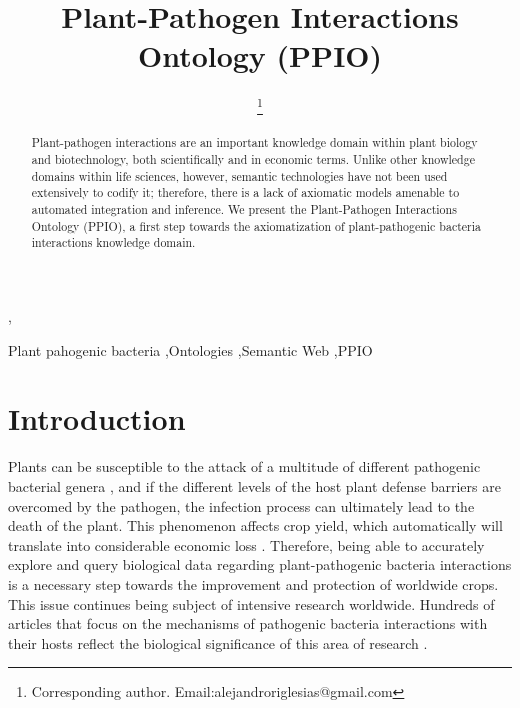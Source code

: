 \documentclass[sw]{iosart2c}
\begin{document}
\begin{frontmatter}

\title{Plant-Pathogen Interactions Ontology (PPIO)}
\runningtitle{}




\author[A]{ \thanks{Corresponding author. Email:alejandroriglesias@gmail.com}},
\author[A]{ }
\author[A]{ }
\author[A]{ }
\runningauthor{}
\address[A]{Biological Informatics Group, Centre for Plant Biotechnology and Genomics (CBGP), Technical University of Madrid (UPM), Spain}

\begin{abstract}
Plant-pathogen interactions are an important knowledge domain within plant biology and biotechnology, both scientifically and in economic terms. Unlike other knowledge domains within life sciences, however, semantic technologies have not been used extensively to codify it; therefore, there is a lack of axiomatic models amenable to automated integration and inference. We present the Plant-Pathogen Interactions Ontology (PPIO), a first step towards the axiomatization of plant-pathogenic bacteria interactions knowledge domain.
\end{abstract}

\begin{keyword}
 Plant pahogenic bacteria \sep Ontologies \sep Semantic Web \sep PPIO
\end{keyword}

\end{frontmatter}


\section{Introduction}\label{s1}

Plants can be susceptible to the attack of a multitude of different pathogenic bacterial genera \cite{Mansfield}, and if the different levels of the host plant defense barriers are overcomed by the pathogen, the infection process can ultimately lead to the death of the plant. This phenomenon affects crop yield, which automatically will translate into considerable economic loss \cite{Montesinos}. Therefore, being able to accurately explore and query biological data regarding plant-pathogenic bacteria interactions is a necessary step towards the improvement and protection of worldwide crops. This issue continues being subject of intensive research worldwide. Hundreds of articles that focus on the mechanisms of pathogenic bacteria interactions with their hosts reflect the biological significance of this area of research \cite{DeWit} \cite {Dodds}. 
\end{document}
